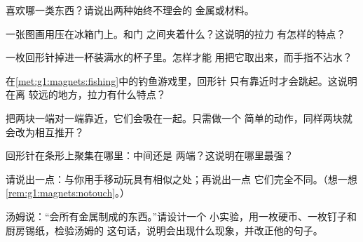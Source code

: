 \begin{exercise}[$\star$]\label{exo:g1:magnets:2}
喜欢哪一类东西？请说出两种始终不理会的
金属或材料。
\end{exercise}

\begin{exercise}[$\star$]\label{exo:g1:magnets:3}
一张图画用压在冰箱门上。和门
之间夹着什么？这说明的拉力
有怎样的特点？
\end{exercise}

\begin{exercise}[$\star$]\label{exo:g1:magnets:4}
一枚回形针掉进一杯装满水的杯子里。怎样才能
用把它取出来，而手指不沾水？
\end{exercise}

\begin{exercise}[$\star$]\label{exo:g1:magnets:5}
在\cref{met:g1:magnets:fishing}中的钓鱼游戏里，回形针
只有靠近时才会跳起。这说明在离
较远的地方，拉力有什么特点？
\end{exercise}

\begin{exercise}[$\star$]\label{exo:g1:magnets:6}
把两块一端对一端靠近，它们会吸在一起。只需做一个
简单的动作，同样两块就会改为相互推开？
\end{exercise}

\begin{exercise}[$\star$]\label{exo:g1:magnets:7}
回形针在条形上聚集在哪里：中间还是
两端？这说明在哪里最强？
\end{exercise}

\begin{exercise}[$\star$]\label{exo:g1:magnets:8}
请说出一点：与你用手移动玩具有相似之处；再说出一点
它们完全不同。（想一想
\cref{rem:g1:magnets:notouch}。）
\end{exercise}

\begin{exercise}[$\star\star$]\label{exo:g1:magnets:9}
汤姆说：“会所有金属制成的东西。”请设计一个
小实验，用一枚硬币、一枚钉子和厨房锡纸，检验汤姆的
这句话，说明会出现什么现象，并改正他的句子。
\end{exercise}
